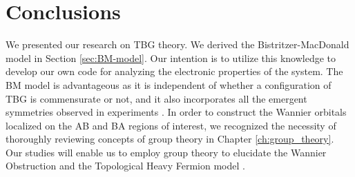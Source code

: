 %
%


\chapter{Conclusions} \label{ch:conclusions}

We presented our research on TBG theory. We derived the Bistritzer-MacDonald model \cite{macdonald2011} in Section \ref{sec:BM-model}. Our intention is to utilize this knowledge to develop our own code for analyzing the electronic properties of the system. The BM model is advantageous as it is independent of whether a configuration of TBG is commensurate or not, and it also incorporates all the emergent symmetries observed in experiments \cite{zou2018}. In order to construct the Wannier orbitals localized on the AB and BA regions of interest, we recognized the necessity of thoroughly reviewing concepts of group theory in Chapter \ref{ch:group_theory}. Our studies will enable us to employ group theory to elucidate the Wannier Obstruction \cite{zou2018} and the Topological Heavy Fermion model \cite{topoheavyfermion2022}.

